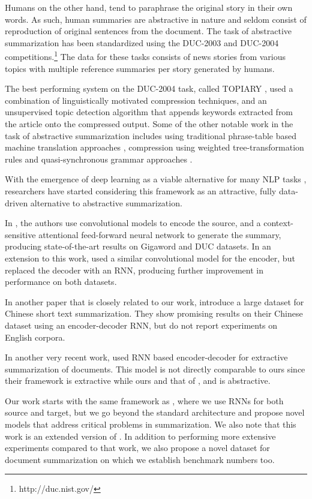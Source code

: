 Humans on the other hand, tend to paraphrase the original story in their own words. As such, human summaries are abstractive in nature and seldom consist of reproduction of original sentences from the document. The task of abstractive summarization has been standardized using the DUC-2003 and DUC-2004 competitions.\footnote{http://duc.nist.gov/} The data for these tasks consists of news stories from various topics with multiple reference summaries per story generated by humans. 

The best performing system on the DUC-2004 task, called TOPIARY \cite{topiary}, used a combination of linguistically motivated compression techniques, and an unsupervised topic detection algorithm that appends keywords extracted from the article onto the compressed output. Some of the other notable work in the task of abstractive summarization includes using traditional phrase-table based machine translation approaches \cite{mt4summ}, compression using weighted tree-transformation rules \cite{cohn_lapata} and quasi-synchronous grammar approaches \cite{woodsend}.

With the emergence of deep learning as a viable alternative for many NLP tasks \cite{nlp_from_scratch}, researchers have started considering this framework as an  attractive, fully data-driven alternative to abstractive summarization. 

In , the authors use convolutional models to encode the source, and a context-sensitive attentional feed-forward neural network to generate the summary, producing state-of-the-art results on Gigaword and DUC datasets. In an extension to this work,  used a similar convolutional model for the encoder, but replaced the decoder with an RNN, producing further improvement in performance on both datasets.

In another paper that is closely related to our work,  introduce a large dataset for Chinese short text summarization. They show promising results on their Chinese dataset using an encoder-decoder RNN, but do not report experiments on English corpora. 

In another very recent work,  used RNN based encoder-decoder for extractive summarization of documents. This model is not directly comparable to ours since their framework is extractive while ours and that of \cite{namas}, \cite{hu:2015:EMNLP} and \cite{chopra} is abstractive.

Our work starts with the same framework as \cite{hu:2015:EMNLP}, where we use RNNs for both source and target, but we go beyond the standard architecture and propose novel models that address critical problems in summarization. We also note that this work is an extended version of . In addition to performing more extensive experiments compared to that work, we also propose a novel dataset for document summarization on which we establish benchmark numbers too.

